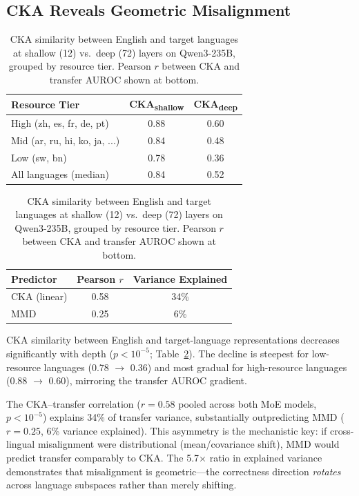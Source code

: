 \documentclass[11pt,a4paper]{article}
\begin{document}
\subsection{CKA Reveals Geometric Misalignment}
\label{sec:cka_results}

\begin{table}[t]
\centering
\small
\caption{CKA similarity between English and target languages at shallow (12) vs.\ deep (72) layers on Qwen3-235B, grouped by resource tier. Pearson $r$ between CKA and transfer AUROC shown at bottom.}
\label{tab:cka}
\begin{tabular}{lcc}
\toprule
\textbf{Resource Tier} & \textbf{CKA\textsubscript{shallow}} & \textbf{CKA\textsubscript{deep}} \\
\midrule
High (zh, es, fr, de, pt) & 0.88 & 0.60 \\
Mid (ar, ru, hi, ko, ja, ...) & 0.84 & 0.48 \\
Low (sw, bn) & 0.78 & 0.36 \\
\midrule
All languages (median) & 0.84 & 0.52 \\
\bottomrule
\end{tabular}
\vspace{4pt}

\begin{tabular}{lcc}
\toprule
\textbf{Predictor} & \textbf{Pearson $r$} & \textbf{Variance Explained} \\
\midrule
CKA (linear) & 0.58 & 34\% \\
MMD & 0.25 & 6\% \\
\bottomrule
\end{tabular}
\end{table}

CKA similarity between English and target-language representations decreases significantly with depth ($p < 10^{-5}$; Table~\ref{tab:cka}). The decline is steepest for low-resource languages (0.78 $\to$ 0.36) and most gradual for high-resource languages (0.88 $\to$ 0.60), mirroring the transfer AUROC gradient.

The CKA--transfer correlation ($r = 0.58$ pooled across both MoE models, $p < 10^{-5}$) explains 34\% of transfer variance, substantially outpredicting MMD ($r = 0.25$, 6\% variance explained). This asymmetry is the mechanistic key: if cross-lingual misalignment were distributional (mean/covariance shift), MMD would predict transfer comparably to CKA. The 5.7$\times$ ratio in explained variance demonstrates that misalignment is geometric---the correctness direction \emph{rotates} across language subspaces rather than merely shifting.
\end{document}
